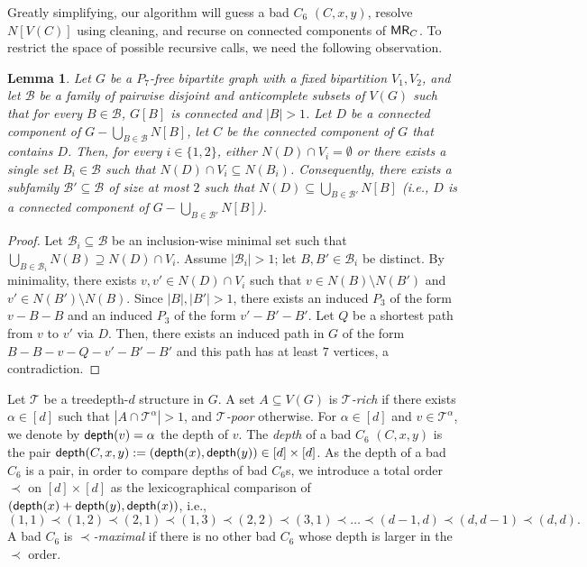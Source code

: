 \documentclass[11pt,a4paper]{article}
\newtheorem{lemma}[theorem]{Lemma}
\theoremstyle{definition}
\def\T{\mathcal{T}}
\newcommand{\prz}[2][]{\todo[color=olive!80,#1]{{\textbf{prz:} #2}}}
\begin{document}
Greatly simplifying, our algorithm will guess a bad $C_6$ $(C,x,y)$, resolve $N[V(C)]$ using cleaning,
and recurse on connected components of $\mathsf{MR}_C$. 
To restrict the space of possible recursive calls, we need the following observation.
\begin{lemma}\label{lem:bip-comp-nei}
Let $G$ be a $P_7$-free bipartite graph with a fixed bipartition $V_1,V_2$, and let $\mathcal{B}$ be a family of
pairwise disjoint and anticomplete subsets of $V(G)$ such that for every $B \in \mathcal{B}$,
$G[B]$ is connected and $|B| > 1$. 
Let $D$ be a connected component of $G-\bigcup_{B \in \mathcal{B}} N[B]$, let $C$ be the connected component of $G$ that contains $D$.
Then, for every $i \in \{1,2\}$, either $N(D) \cap V_i = \emptyset$ or there exists a single set $B_i \in \mathcal{B}$ such that
$N(D) \cap V_i \subseteq N(B_i)$. 
Consequently, there exists a subfamily $\mathcal{B}' \subseteq \mathcal{B}$ of size at most $2$ such that $N(D) \subseteq \bigcup_{B \in \mathcal{B}'} N[B]$
(i.e., $D$ is a connected component of $G-\bigcup_{B \in \mathcal{B}'} N[B]$). 
\end{lemma}
\begin{proof}
    Let $\mathcal{B}_i \subseteq \mathcal{B}$ be an inclusion-wise minimal set such that $\bigcup_{B \in \mathcal{B}_i} N(B) \supseteq N(D) \cap V_i$.
    Assume $|\mathcal{B}_i| > 1$; let $B,B' \in \mathcal{B}_i$ be distinct. 
    By minimality, there exists $v,v' \in N(D) \cap V_i$ such that $v \in N(B) \setminus N(B')$ and $v' \in N(B') \setminus N(B)$.
    Since $|B|,|B'|>1$, there exists an induced $P_3$ of the form $v-B-B$ and an induced $P_3$ of the form $v'-B'-B'$. 
    Let $Q$ be a shortest path from $v$ to $v'$ via $D$. Then, there exists an induced path in $G$ of the form $B-B-v-Q-v'-B'-B'$
    and this path has at least $7$ vertices, a contradiction.
\end{proof}

Let $\T$ be a treedepth-$d$ structure in $G$.
A set $A \subseteq V(G)$ is \emph{$\T$-rich} if there exists $\alpha \in [d]$ such that $|A \cap \T^\alpha| > 1$, and \emph{$\T$-poor} otherwise. 
For $\alpha \in [d]$ and $v \in \T^\alpha$, we denote by $\mathsf{depth}(v) = \alpha$  the depth of $v$. %
The \emph{depth} of a bad $C_6$ $(C,x,y)$ is the pair $\mathsf{depth}(C,x,y) := (\mathsf{depth}(x),\mathsf{depth}(y)) \in [d] \times [d]$.
As the depth of a bad $C_6$ is a pair, in order to compare  depths of bad $C_6$s, we introduce a total order $\prec$ on $[d] \times [d]$
as the lexicographical comparison of $(\mathsf{depth}(x) + \mathsf{depth}(y), \mathsf{depth}(x))$, i.e.,
\[ (1,1) \prec (1,2) \prec (2,1) \prec (1,3) \prec (2,2) \prec (3,1) \prec \ldots \prec (d-1,d) \prec (d,d-1) \prec (d,d). \]
A bad $C_6$ is \emph{$\prec$-maximal} if there is no other bad $C_6$ whose depth is larger in the $\prec$ order.
\end{document}
